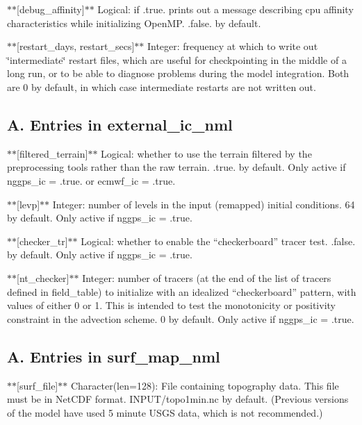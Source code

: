 $\ast$$\ast$\mbox{[}debug\-\_\-affinity\mbox{]}$\ast$$\ast$ Logical\-: if .true. prints out a message describing cpu affinity characteristics while initializing Open\-M\-P. .false. by default.

$\ast$$\ast$\mbox{[}restart\-\_\-days, restart\-\_\-secs\mbox{]}$\ast$$\ast$ Integer\-: frequency at which to write out \char`\"{}intermediate\char`\"{} restart files, which are useful for checkpointing in the middle of a long run, or to be able to diagnose problems during the model integration. Both are 0 by default, in which case intermediate restarts are not written out.

\subsection*{A. Entries in external\-\_\-ic\-\_\-nml}

$\ast$$\ast$\mbox{[}filtered\-\_\-terrain\mbox{]}$\ast$$\ast$ Logical\-: whether to use the terrain filtered by the preprocessing tools rather than the raw terrain. .true. by default. Only active if nggps\-\_\-ic = .true. or ecmwf\-\_\-ic = .true.

$\ast$$\ast$\mbox{[}levp\mbox{]}$\ast$$\ast$ Integer\-: number of levels in the input (remapped) initial conditions. 64 by default. Only active if nggps\-\_\-ic = .true.

$\ast$$\ast$\mbox{[}checker\-\_\-tr\mbox{]}$\ast$$\ast$ Logical\-: whether to enable the ``checkerboard'' tracer test. .false. by default. Only active if nggps\-\_\-ic = .true.

$\ast$$\ast$\mbox{[}nt\-\_\-checker\mbox{]}$\ast$$\ast$ Integer\-: number of tracers (at the end of the list of tracers defined in field\-\_\-table) to initialize with an idealized ``checkerboard'' pattern, with values of either 0 or 1. This is intended to test the monotonicity or positivity constraint in the advection scheme. 0 by default. Only active if nggps\-\_\-ic = .true.

\subsection*{A. Entries in surf\-\_\-map\-\_\-nml}

$\ast$$\ast$\mbox{[}surf\-\_\-file\mbox{]}$\ast$$\ast$ Character(len=128)\-: File containing topography data. This file must be in Net\-C\-D\-F format. I\-N\-P\-U\-T/topo1min.\-nc by default. (Previous versions of the model have used 5 minute U\-S\-G\-S data, which is not recommended.)

